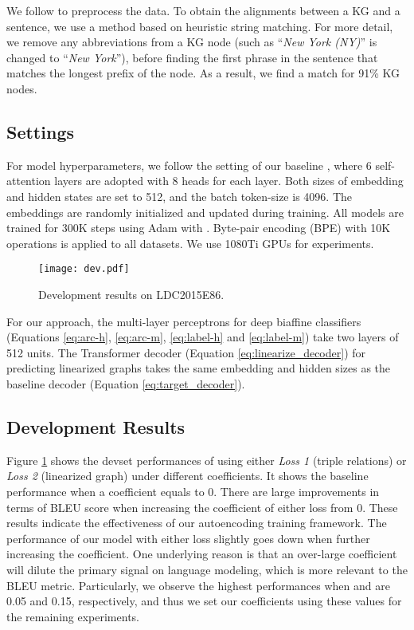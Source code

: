 \documentclass[11pt,a4paper]{article}
\begin{document}
We follow \citet{marcheggiani2018deep} to preprocess the data. 
To obtain 
the alignments between a KG and a sentence,
we use a method based on heuristic string matching.
For more detail, we remove any abbreviations from a KG node (such as ``\emph{New York (NY)}'' is changed to ``\emph{New York}''), before finding the first phrase in the sentence that matches the longest prefix of the node.
As a result, we find a match for 91\% KG nodes.


\subsection{Settings}


For model hyperparameters, we follow the setting of our baseline \citep{zhu2019modeling}, where 6 self-attention layers are adopted with 8 heads for each layer.
Both sizes of embedding and hidden states are set to 512, and the batch token-size is 4096.
The embeddings are randomly initialized and updated during training.
All models are trained for 300K steps using Adam \citep{kingma2014adam} with .
Byte-pair encoding (BPE) \citep{sennrich2016neural} with 10K operations is applied to all datasets.
We use 1080Ti GPUs for experiments.


\begin{figure}
    \centering
    \texttt{[image: dev.pdf]}
    \caption{Development results on LDC2015E86.}
    \label{fig:dev_results}
\end{figure}


For our approach, the multi-layer perceptrons for deep biaffine classifiers (Equations \ref{eq:arc-h}, \ref{eq:arc-m}, \ref{eq:label-h} and \ref{eq:label-m}) take two layers of 512 units.
The Transformer decoder (Equation \ref{eq:linearize_decoder}) for predicting linearized graphs takes the same embedding and hidden sizes as the baseline decoder (Equation \ref{eq:target_decoder}).


\subsection{Development Results}


Figure \ref{fig:dev_results} shows the devset performances of using either \emph{Loss 1} (triple relations) or \emph{Loss 2} (linearized graph) under different coefficients.
It shows the baseline performance when a coefficient equals to 0.
There are large improvements in terms of BLEU score when increasing the coefficient of either loss from 0.
These results indicate the effectiveness of our autoencoding training framework.
The performance of our model with either loss slightly goes down when further increasing the coefficient.
One underlying reason is that an over-large coefficient will dilute the primary signal on language modeling, which is more relevant to the BLEU metric.
Particularly, we observe the highest performances when  and  are 0.05 and 0.15, respectively, and thus we set our coefficients using these values for the remaining experiments.
\end{document}
